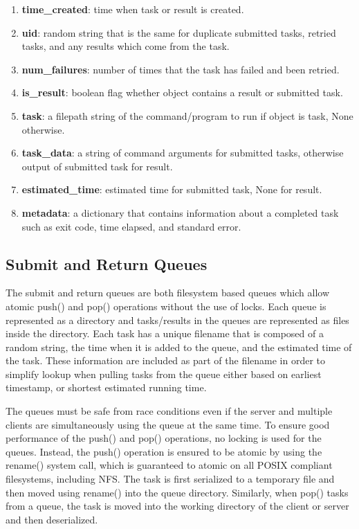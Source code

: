 \documentclass{article}
\begin{document}
\begin{enumerate}
\item \textbf{time\_created}: time when task or result is created.
\item \textbf{uid}: random string that is the same for duplicate submitted tasks, retried tasks, and any results which come from the task.
\item \textbf{num\_failures}: number of times that the task has failed and been retried.
\item \textbf{is\_result}: boolean flag whether object contains a result or submitted task.
\item \textbf{task}: a filepath string of the command/program to run if object is task, None otherwise.
\item \textbf{task\_data}: a string of command arguments for submitted tasks, otherwise output of submitted task for result.
\item \textbf{estimated\_time}: estimated time for submitted task, None for result.
\item \textbf{metadata}: a dictionary that contains information about a completed task such as exit code, time elapsed, and standard error.
\end{enumerate}

\subsection{Submit and Return Queues}

The submit and return queues are both filesystem based queues which allow atomic push() and pop() operations without the use of locks. Each queue is represented as a directory and tasks/results in the queues are represented as files inside the directory. Each task has a unique filename that is composed of a random string, the time when it is added to the queue, and the estimated time of the task. These information are included as part of the filename in order to simplify lookup when pulling tasks from the queue either based on earliest timestamp, or shortest estimated running time.

The queues must be safe from race conditions even if the server and multiple clients are simultaneously using the queue at the same time. To ensure good performance of the push() and pop() operations, no locking is used for the queues. Instead, the push() operation is ensured to be atomic by using the rename() system call, which is guaranteed to atomic on all POSIX compliant filesystems, including NFS. The task is first serialized to a temporary file and then moved using rename() into the queue directory. Similarly, when pop() tasks from a queue, the task is moved into the working directory of the client or server and then deserialized.
\end{document}
